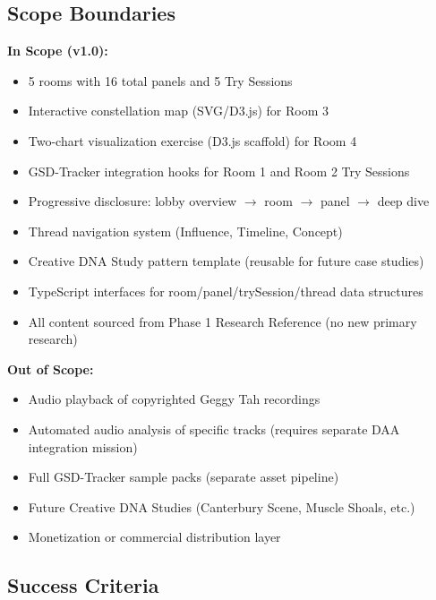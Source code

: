 \documentclass[11pt,letterpaper]{article}
\begin{document}
\subsection{Scope Boundaries}

\textbf{In Scope (v1.0):}
\begin{itemize}[leftmargin=2em]
\item 5 rooms with 16 total panels and 5 Try Sessions
\item Interactive constellation map (SVG/D3.js) for Room 3
\item Two-chart visualization exercise (D3.js scaffold) for Room 4
\item GSD-Tracker integration hooks for Room 1 and Room 2 Try Sessions
\item Progressive disclosure: lobby overview $\rightarrow$ room $\rightarrow$ panel $\rightarrow$ deep dive
\item Thread navigation system (Influence, Timeline, Concept)
\item Creative DNA Study pattern template (reusable for future case studies)
\item TypeScript interfaces for room/panel/trySession/thread data structures
\item All content sourced from Phase 1 Research Reference (no new primary research)
\end{itemize}

\textbf{Out of Scope:}
\begin{itemize}[leftmargin=2em]
\item Audio playback of copyrighted Geggy Tah recordings
\item Automated audio analysis of specific tracks (requires separate DAA integration mission)
\item Full GSD-Tracker sample packs (separate asset pipeline)
\item Future Creative DNA Studies (Canterbury Scene, Muscle Shoals, etc.)
\item Monetization or commercial distribution layer
\end{itemize}

\subsection{Success Criteria}
\end{document}
